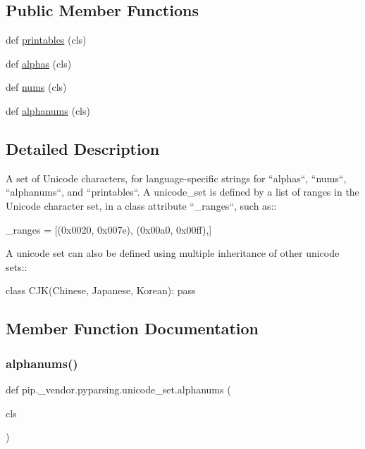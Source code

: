 \subsection*{Public Member Functions}
\begin{DoxyCompactItemize}
\item 
def \hyperlink{classpip_1_1__vendor_1_1pyparsing_1_1unicode__set_a1adcb48a62fc23eaa9df7de3ce25a81f}{printables} (cls)
\item 
def \hyperlink{classpip_1_1__vendor_1_1pyparsing_1_1unicode__set_a9b868e8f62d00e2c58ea9144af4de695}{alphas} (cls)
\item 
def \hyperlink{classpip_1_1__vendor_1_1pyparsing_1_1unicode__set_a6be272817dada15ab03cff8b6e269d8e}{nums} (cls)
\item 
def \hyperlink{classpip_1_1__vendor_1_1pyparsing_1_1unicode__set_a077f72cd0675eb9eeeff1f536ba0e484}{alphanums} (cls)
\end{DoxyCompactItemize}


\subsection{Detailed Description}
\begin{DoxyVerb}A set of Unicode characters, for language-specific strings for
``alphas``, ``nums``, ``alphanums``, and ``printables``.
A unicode_set is defined by a list of ranges in the Unicode character
set, in a class attribute ``_ranges``, such as::

    _ranges = [(0x0020, 0x007e), (0x00a0, 0x00ff),]

A unicode set can also be defined using multiple inheritance of other unicode sets::

    class CJK(Chinese, Japanese, Korean):
        pass
\end{DoxyVerb}
 

\subsection{Member Function Documentation}
\mbox{\label{classpip_1_1__vendor_1_1pyparsing_1_1unicode__set_a077f72cd0675eb9eeeff1f536ba0e484}} 
\subsubsection{\texorpdfstring{alphanums()}{alphanums()}}
{\footnotesize\ttfamily def pip.\+\_\+vendor.\+pyparsing.\+unicode\+\_\+set.\+alphanums (\begin{DoxyParamCaption}\item[{}]{cls }\end{DoxyParamCaption})}

